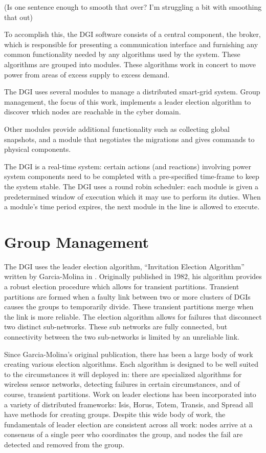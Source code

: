 (Is one sentence enough to smooth that over? I'm struggling a bit with smoothing that out)

To accomplish this, the DGI software consists of a central component, the
broker, which is responsible for presenting a communication interface and
furnishing any common functionality needed by any algorithms used by the
system. These algorithms are grouped into modules. These algorithms work in
concert to move power from areas of excess supply to excess demand.

The DGI uses several modules to manage a distributed smart-grid system. Group
management, the focus of this work, implements a leader election algorithm to
discover which nodes are reachable in the cyber domain.

Other modules provide additional functionality such as collecting global
snapshots, and a module that negotiates the migrations and gives commands to
physical components.

The DGI is a real-time system: certain actions (and reactions) involving power
system components need to be completed with a pre-specified time-frame to keep
the system stable. The DGI uses a round robin scheduler: each module is given
a predetermined window of execution which it may use to perform its duties. When
a module's time period expires, the next module in the line is allowed to
execute. 
 
\section{Group Management}
The DGI uses the leader election algorithm, ``Invitation Election
Algorithm'' written by Garcia-Molina in \cite{INVITATIONELECTION}.
Originally published in 1982, his algorithm provides a robust election 
procedure which allows for transient
partitions. Transient partitions are formed when a faulty link between two or
more clusters of DGIs causes the groups to temporarily divide. These transient
partitions merge when the link is more reliable. The election algorithm
allows for failures that disconnect two distinct sub-networks. These sub
networks are fully connected, but connectivity between the two sub-networks is
limited by an unreliable link.

Since Garcia-Molina's original publication, there has been a large body of
work creating various election algorithms. Each algorithm is
designed to be well suited to the circumstances it will deployed in: there are
specialized algorithms for wireless sensor
networks\cite{LE-WSN-1}\cite{LE-WSN-2}, detecting failures in
certain
circumstances\cite{LE-SPECIALCIRCUMSTANCES-1}\cite{LE-SPECIALCIRCUMSTANCES-2}, and of course, transient partitions. Work on leader
elections has been incorporated into a variety of distributed frameworks:
Isis\cite{ISISTOOLKIT},
Horus\cite{HORUSTOOLKIT}, Totem\cite{TOTEMTOOLKIT},
Transis\cite{TRANSISTOOLKIT}, and Spread\cite{SPREADTOOLKIT} all have methods for creating groups. Despite
this wide body of work, the fundamentals of leader election are consistent
across all work: nodes arrive at a consensus of a single peer who coordinates
the group, and nodes the fail are detected and removed from the group. 

